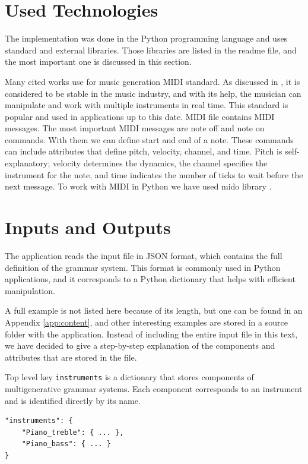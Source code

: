 \section{Used Technologies}
The implementation was done in the Python programming language and uses standard and external libraries. Those libraries are listed in the readme file, and the most important one is discussed in this section. 

Many cited works use for music generation MIDI standard. As discussed in \cite{muller_midi}, it is considered to be stable in the music industry, and with its help, the musician can manipulate and work with multiple instruments in real time. This standard is popular and used in applications up to this date. MIDI file contains MIDI messages. The most important MIDI messages are note off and note on commands. With them we can define start and end of a note. These commands can include attributes that define pitch, velocity, channel, and time. Pitch is self-explanatory; velocity determines the dynamics, the channel specifies the instrument for the note, and time indicates the number of ticks to wait before the next message. To work with MIDI in Python we have used mido library \cite{mido}.

\section{Inputs and Outputs}
The application reads the input file in JSON format, which contains the full definition of the grammar system. This format is commonly used in Python applications, and it corresponds to a Python dictionary that helps with efficient manipulation. 

A full example is not listed here because of its length, but one can be found in an Appendix \ref{app:content}, and other interesting examples are stored in a source folder with the application. Instead of including the entire input file in this text, we have decided to give a step-by-step explanation of the components and attributes that are stored in the file.

Top level key \texttt{instruments} is a dictionary that stores components of multigenerative grammar systems. Each component corresponds to an instrument and is identified directly by its name.

\begin{verbatim}
"instruments": {
    "Piano_treble": { ... },
    "Piano_bass": { ... }
}
\end{verbatim}


